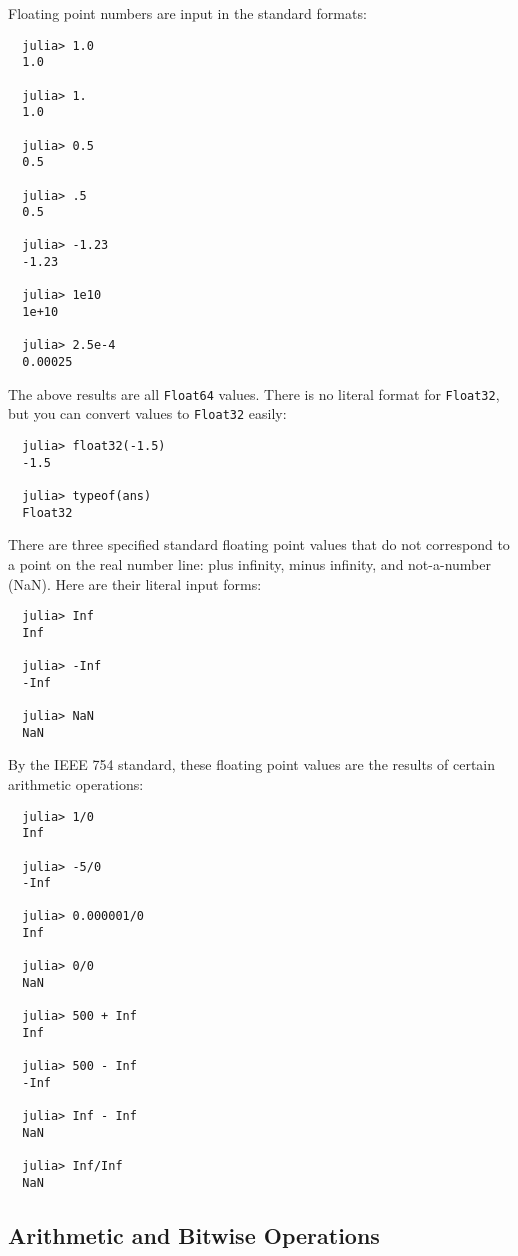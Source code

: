 \documentclass{article}
\begin{document}
Floating point numbers are input in the standard formats:
\begin{verbatim}
  julia> 1.0
  1.0

  julia> 1.
  1.0

  julia> 0.5
  0.5

  julia> .5
  0.5

  julia> -1.23
  -1.23

  julia> 1e10
  1e+10

  julia> 2.5e-4
  0.00025
\end{verbatim}
The above results are all \verb|Float64| values. There is no literal format for \verb|Float32|, but you can convert values to \verb|Float32| easily:
\begin{verbatim}
  julia> float32(-1.5)
  -1.5

  julia> typeof(ans)
  Float32
\end{verbatim}
There are three specified standard floating point values that do not correspond to a point on the real number line: plus infinity, minus infinity, and not-a-number (NaN).
Here are their literal input forms:
\begin{verbatim}
  julia> Inf
  Inf

  julia> -Inf
  -Inf

  julia> NaN
  NaN
\end{verbatim}
By the IEEE 754 standard, these floating point values are the results of certain arithmetic operations:
\begin{verbatim}
  julia> 1/0
  Inf

  julia> -5/0
  -Inf

  julia> 0.000001/0
  Inf

  julia> 0/0
  NaN

  julia> 500 + Inf
  Inf

  julia> 500 - Inf
  -Inf

  julia> Inf - Inf
  NaN

  julia> Inf/Inf
  NaN
\end{verbatim}

\subsection{Arithmetic and Bitwise Operations}
\end{document}
